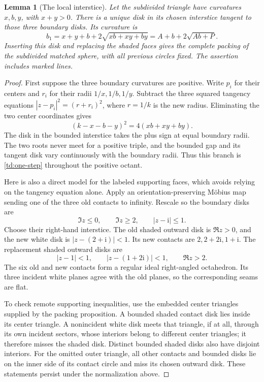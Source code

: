 \documentclass[11pt]{article}
\numberwithin{equation}{section}
\newtheorem{lemma}[theorem]{Lemma}
\theoremstyle{definition}
\newcommand{\ii}{\mathrm i}
\begin{document}
\begin{lemma}[The local interstice]\label{td:interstice}
Let the subdivided triangle have curvatures \(x,b,y\), with
\(x+y>0\). There is a unique disk in its chosen interstice tangent
to those three boundary disks. Its curvature is
\begin{equation}\label{td:one-step}
 b_1=x+y+b+2\sqrt{xb+xy+by}
       =A+b+2\sqrt{Ab+P}.
\end{equation}
Inserting this disk and replacing the shaded faces gives the
complete packing of the subdivided matched sphere, with all
previous circles fixed. The assertion includes marked lines.
\end{lemma}

\begin{proof}
First suppose the three boundary curvatures are positive. Write
\(p_i\) for their centers and \(r_i\) for their radii
\(1/x,1/b,1/y\). Subtract the three squared tangency equations
\(|z-p_i|^2=(r+r_i)^2\), where \(r=1/k\) is the new radius.
Eliminating the two center coordinates gives
\[
 (k-x-b-y)^2=4(xb+xy+by).
 \]
The disk in the bounded interstice takes the plus sign at equal
boundary radii. The two roots never meet for a positive triple,
and the bounded gap and its tangent disk vary continuously with
the boundary radii. Thus this branch is \eqref{td:one-step}
throughout the positive octant.

Here is also a direct model for the labeled supporting faces, which
avoids relying on the tangency equation alone. Apply an
orientation-preserving Möbius map sending one of the three old
contacts to infinity. Rescale so the boundary disks are
\[
 \Im z\le0,\qquad \Im z\ge2,\qquad |z-\ii|\le1 .
 \]
Choose their right-hand interstice. The old shaded outward disk is
\(\Re z>0\), and the new white disk is
\(|z-(2+\ii)|<1\). Its new contacts are \(2,2+2\ii,1+\ii\).
The replacement shaded outward disks are
\begin{equation}\label{td:shaded}
 |z-1|<1,\qquad |z-(1+2\ii)|<1,\qquad \Re z>2 .
\end{equation}
The six old and new contacts form a regular ideal right-angled
octahedron. Its three incident white planes agree with the old
planes, so the corresponding seams are flat.

To check remote supporting inequalities, use the embedded center
triangles supplied by the packing proposition. A bounded shaded
contact disk lies inside its center triangle. A nonincident white
disk meets that triangle, if at all, through its own incident
sectors, whose interiors belong to different center triangles;
it therefore misses the shaded disk. Distinct bounded shaded disks
also have disjoint interiors. For the omitted outer triangle, all
other contacts and bounded disks lie on the inner side of its
contact circle and miss its chosen outward disk.
These statements persist under the normalization above.


\end{proof}
\end{document}
